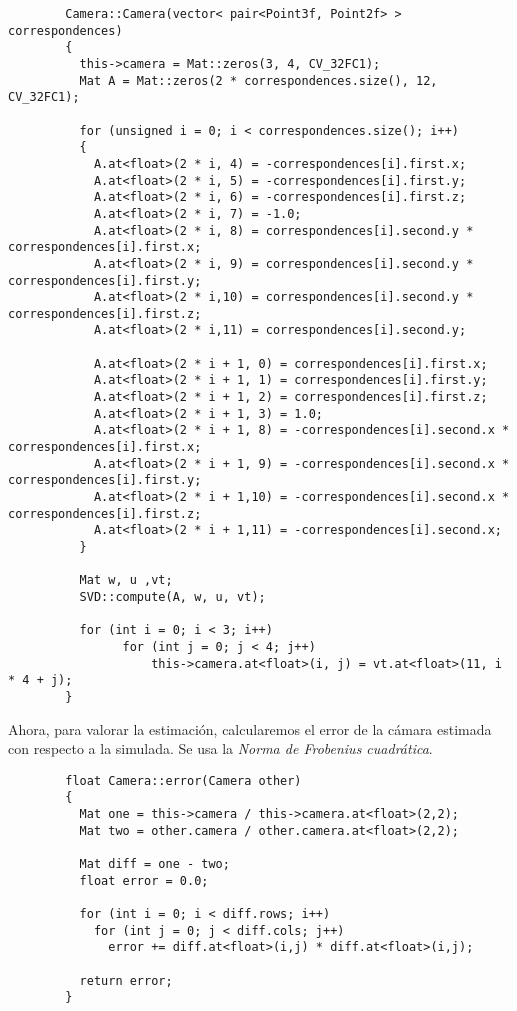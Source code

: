 \documentclass[a4paper, 11pt]{article}
\theoremstyle{definition}
\begin{document}
      \begin{lstlisting}
        Camera::Camera(vector< pair<Point3f, Point2f> > correspondences)
        {
          this->camera = Mat::zeros(3, 4, CV_32FC1);
          Mat A = Mat::zeros(2 * correspondences.size(), 12, CV_32FC1);

          for (unsigned i = 0; i < correspondences.size(); i++)
          {
            A.at<float>(2 * i, 4) = -correspondences[i].first.x;
            A.at<float>(2 * i, 5) = -correspondences[i].first.y;
            A.at<float>(2 * i, 6) = -correspondences[i].first.z;
            A.at<float>(2 * i, 7) = -1.0;
            A.at<float>(2 * i, 8) = correspondences[i].second.y * correspondences[i].first.x;
            A.at<float>(2 * i, 9) = correspondences[i].second.y * correspondences[i].first.y;
            A.at<float>(2 * i,10) = correspondences[i].second.y * correspondences[i].first.z;
            A.at<float>(2 * i,11) = correspondences[i].second.y;

            A.at<float>(2 * i + 1, 0) = correspondences[i].first.x;
            A.at<float>(2 * i + 1, 1) = correspondences[i].first.y;
            A.at<float>(2 * i + 1, 2) = correspondences[i].first.z;
            A.at<float>(2 * i + 1, 3) = 1.0;
            A.at<float>(2 * i + 1, 8) = -correspondences[i].second.x * correspondences[i].first.x;
            A.at<float>(2 * i + 1, 9) = -correspondences[i].second.x * correspondences[i].first.y;
            A.at<float>(2 * i + 1,10) = -correspondences[i].second.x * correspondences[i].first.z;
            A.at<float>(2 * i + 1,11) = -correspondences[i].second.x;
          }

          Mat w, u ,vt;
          SVD::compute(A, w, u, vt);

          for (int i = 0; i < 3; i++)
        		for (int j = 0; j < 4; j++)
        			this->camera.at<float>(i, j) = vt.at<float>(11, i * 4 + j);
        }

      \end{lstlisting}

      Ahora, para valorar la estimación, calcularemos el error de la cámara estimada con
      respecto a la simulada. Se usa la \emph{Norma de Frobenius cuadrática}.

      \begin{lstlisting}
        float Camera::error(Camera other)
        {
          Mat one = this->camera / this->camera.at<float>(2,2);
          Mat two = other.camera / other.camera.at<float>(2,2);

          Mat diff = one - two;
          float error = 0.0;

          for (int i = 0; i < diff.rows; i++)
            for (int j = 0; j < diff.cols; j++)
              error += diff.at<float>(i,j) * diff.at<float>(i,j);

          return error;
        }
      \end{lstlisting}
\end{document}
